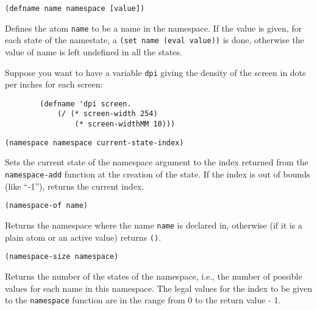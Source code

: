 {\usagefont\begin{verbatim}
(defname name namespace [value])
\end{verbatim}}\usageupspace

Defines the atom \verb"name" to be a name in the namespace. If the value is
given, for each state of the namestate, a \verb"(set name (eval value))" is
done, otherwise the value of name is left undefined in all the states.

Suppose you want to have a variable \verb"dpi" giving the density of the
screen in dots per inches for each screen:

{\exemplefont\begin{verbatim}
        (defname 'dpi screen.
            (/ (* screen-width 254) 
                (* screen-widthMM 10)))
\end{verbatim}}


{\usagefont\begin{verbatim}
(namespace namespace current-state-index)
\end{verbatim}}\usageupspace

Sets the current state of the namespace argument to the index returned
from the
\verb"namespace-add" function at the creation of the state. If the index is
out of bounds (like ``-1''), returns the current index.


{\usagefont\begin{verbatim}
(namespace-of name)
\end{verbatim}}\usageupspace

Returns the namespace where the name \verb"name" is declared in, otherwise
(if it is a plain atom or an active value) returns \verb"()".


{\usagefont\begin{verbatim}
(namespace-size namespace)
\end{verbatim}}\usageupspace

Returns the number of the states of the namespace, i.e., the number of
possible values for each name in this namespace. The legal values for the
index to be given to the \verb"namespace" function are in the range
from 0 to the return value - 1.

        
